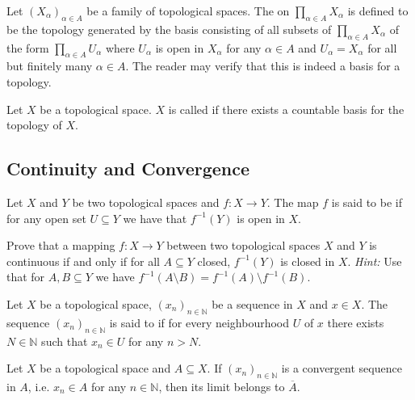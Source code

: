 \begin{example}
	Let $(X_\alpha)_{\alpha \in A}$ be a family of topological spaces. The  on $\prod_{\alpha \in A} X_\alpha$ is defined to be the topology generated by the basis consisting of all subsets of $\prod_{\alpha \in A} X_\alpha$ of the form $\prod_{\alpha \in A} U_\alpha$ where $U_\alpha$ is open in $X_\alpha$ for any $\alpha \in A$ and $U_\alpha = X_\alpha$ for all but finitely many $\alpha \in A$. The reader may verify that this is indeed a basis for a topology.
\end{example}

\begin{definition}
	Let $X$ be a topological space. $X$ is called  if there exists a countable basis for the topology of $X$.
\end{definition}

\subsection{Continuity and Convergence}

\begin{definition}
	Let $X$ and $Y$ be two topological spaces and $f: X \to Y$. The map $f$ is said to be  if for any open set $U \subseteq Y$ we have that $f^{-1}(Y)$ is open in $X$.
\end{definition}

\begin{exercise}
	Prove that a mapping $f: X \to Y$ between two topological spaces $X$ and $Y$ is continuous if and only if for all $A \subseteq Y$ closed, $f^{-1}(Y)$ is closed in $X$. \textit{Hint:} Use that for $A,B \subseteq Y$ we have $f^{-1}(A \setminus B) = f^{-1}(A) \setminus f^{-1}(B)$.
\end{exercise}
	
\begin{definition}
	Let $X$ be a topological space, $(x_n)_{n \in \mathbb{N}}$ be a sequence in $X$ and $x \in X$. The sequence $(x_n)_{n \in \mathbb{N}}$ is said to  if for every neighbourhood $U$ of $x$ there exists $N \in \mathbb{N}$ such that $x_n \in U$ for any $n > N$. 
\end{definition}

\begin{corollary}
	Let $X$ be a topological space and $A \subseteq X$. If $(x_n)_{n \in \mathbb{N}}$ is a convergent sequence in $A$, i.e. $x_n \in A$ for any $n \in \mathbb{N}$, then its limit belongs to $\overline{A}$.
	\label{cor:sequence_closure}
\end{corollary}

